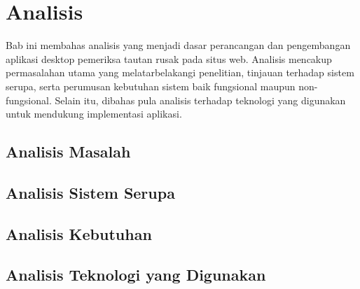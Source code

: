 \chapter{Analisis}
\label{chap:analisis}

Bab ini membahas analisis yang menjadi dasar perancangan dan pengembangan aplikasi desktop pemeriksa tautan rusak pada situs web. Analisis mencakup permasalahan utama yang melatarbelakangi penelitian, tinjauan terhadap sistem serupa, serta perumusan kebutuhan sistem baik fungsional maupun non-fungsional. Selain itu, dibahas pula analisis terhadap teknologi yang digunakan untuk mendukung implementasi aplikasi.

\section{Analisis Masalah}
\label{sec:03-analisis-masalah}
% 


\section{Analisis Sistem Serupa}
\label{sec:03-analisis-sistem-serupa}
% 


\section{Analisis Kebutuhan}
\label{sec:03-analisis-kebutuhan}
% 


\section{Analisis Teknologi yang Digunakan}
\label{sec:03-analisis-teknologi-yang-digunakan}
% 

